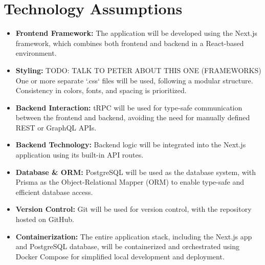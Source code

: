 \documentclass[a4paper,11pt]{article}
\begin{document}




\section{Technology Assumptions}
\begin{itemize}
    \item \textbf{Frontend Framework:} The application will be developed using the Next.js framework, which combines both frontend and backend in a React-based environment.
    \item \textbf{Styling:} TODO: TALK TO PETER ABOUT THIS ONE (FRAMEWORKS) One or more separate `.css` files will be used, following a modular structure. Consistency in colors, fonts, and spacing is prioritized.
    \item \textbf{Backend Interaction:} tRPC will be used for type-safe communication between the frontend and backend, avoiding the need for manually defined REST or GraphQL APIs.
    \item \textbf{Backend Technology:} Backend logic will be integrated into the Next.js application using its built-in API routes.
    \item \textbf{Database \& ORM:} PostgreSQL will be used as the database system, with Prisma as the Object-Relational Mapper (ORM) to enable type-safe and efficient database access.
    \item \textbf{Version Control:} Git will be used for version control, with the repository hosted on GitHub.
    \item \textbf{Containerization:} The entire application stack, including the Next.js app and PostgreSQL database, will be containerized and orchestrated using Docker Compose for simplified local development and deployment.
\end{itemize}
\end{document}
